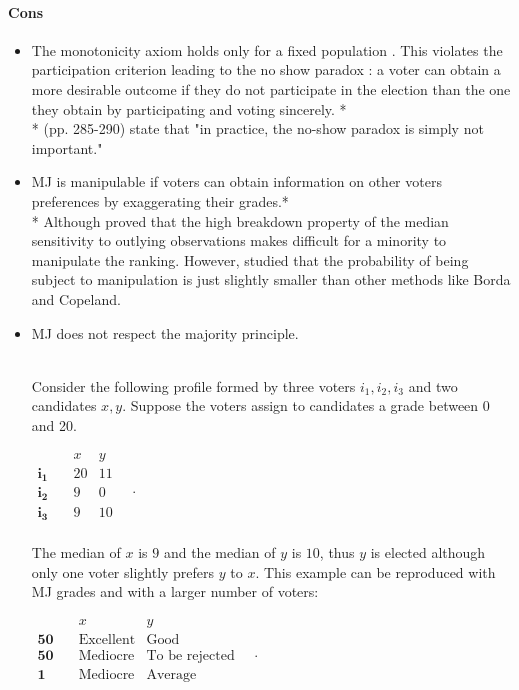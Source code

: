 \paragraph{Cons}
\begin{itemize}
	\item The monotonicity axiom holds only for a fixed population \citep{Felsenthal2008,Laslier2018}. This violates the participation criterion leading to the no show paradox \citep{Fishburn1983}: a voter can obtain a more desirable outcome if they do not participate in the election than the one they obtain by participating and voting sincerely. *\\
	* \citet{Balinski2011}(pp. 285-290) state that "in practice, the no-show paradox is simply not important."
	\item \ac{MJ} is manipulable if voters can obtain information on other voters preferences by exaggerating their grades.* \\
	* Although \citet{Bassett1999} proved that the high breakdown property of the median \textemdash sensitivity to outlying observations \textemdash makes difficult for a minority to manipulate the ranking. However, \citet{Gehrlein2003} studied that the probability of being subject to manipulation is just slightly smaller than other methods like Borda and Copeland.
	\item \ac{MJ} does not respect the majority principle.
	\begin{example}\citet{Laslier2018}\\ Consider the following profile formed by three voters $i_1, i_2, i_3$ and two candidates $x, y$. Suppose the voters assign to candidates a grade between 0 and 20.
		\begin{center}
			$
			\begin{array}{ccc}
				& x & y \\
				\mathbf{i_1} \quad &20&11\\
				\mathbf{i_2} \quad &9&0\\
				\mathbf{i_3} \quad &9&10\\
			\end{array}\quad .
			$
		\end{center}
		The median of $x$ is $9$ and the median of $y$ is $10$, thus $y$ is elected although only one voter slightly prefers $y$ to $x$. This example can be reproduced with \ac{MJ} grades and with a larger number of voters:
		\begin{center}
			$
			\begin{array}{ccc}
				& x & y \\
				\mathbf{50} \quad &\text{Excellent}&\text{Good}\\
				\mathbf{50} \quad &\text{Mediocre}&\text{To be rejected}\\
				\mathbf{1} \quad &\text{Mediocre}&\text{Average}\\
			\end{array}\quad .
			$
		\end{center}
		\label{ex:laslier}
	\end{example}
\end{itemize}
